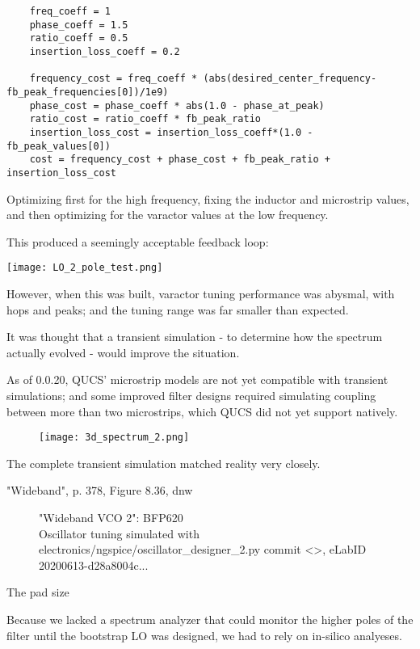 \documentclass[paper.tex]{subfiles}
\begin{document}
\begin{verbatim}
    freq_coeff = 1
    phase_coeff = 1.5
    ratio_coeff = 0.5
    insertion_loss_coeff = 0.2
 
    frequency_cost = freq_coeff * (abs(desired_center_frequency-fb_peak_frequencies[0])/1e9)
    phase_cost = phase_coeff * abs(1.0 - phase_at_peak)
    ratio_cost = ratio_coeff * fb_peak_ratio
    insertion_loss_cost = insertion_loss_coeff*(1.0 - fb_peak_values[0])
    cost = frequency_cost + phase_cost + fb_peak_ratio + insertion_loss_cost
\end{verbatim}

Optimizing first for the high frequency, fixing the inductor and microstrip values, and then optimizing for the varactor values at the low frequency.

This produced a seemingly acceptable feedback loop:

\texttt{[image: LO\_2\_pole\_test.png]}

However, when this was built, varactor tuning performance was abysmal, with hops and peaks; and the tuning range was far smaller than expected.

It was thought that a transient simulation - to determine how the spectrum actually evolved - would improve the situation. 

As of 0.0.20, QUCS' microstrip models are not yet compatible with transient simulations; and some improved filter designs required simulating coupling between more than two microstrips, which QUCS did not yet support natively.

\begin{figure}[H]
\texttt{[image: 3d\_spectrum\_2.png]}
\end{figure}

The complete transient simulation matched reality very closely. 

"Wideband", p. 378, Figure 8.36, dnw

\begin{figure}[H]
	
 	\caption{"Wideband VCO 2": BFP620  \\
 	 Oscillator tuning simulated with electronics/ngspice/oscillator\_designer\_2.py commit <>, eLabID 20200613-d28a8004c...}
\end{figure}

The pad size 

Because we lacked a spectrum analyzer that could monitor the higher poles of the filter until the bootstrap LO was designed, we had to rely on in-silico analyeses.
\end{document}
